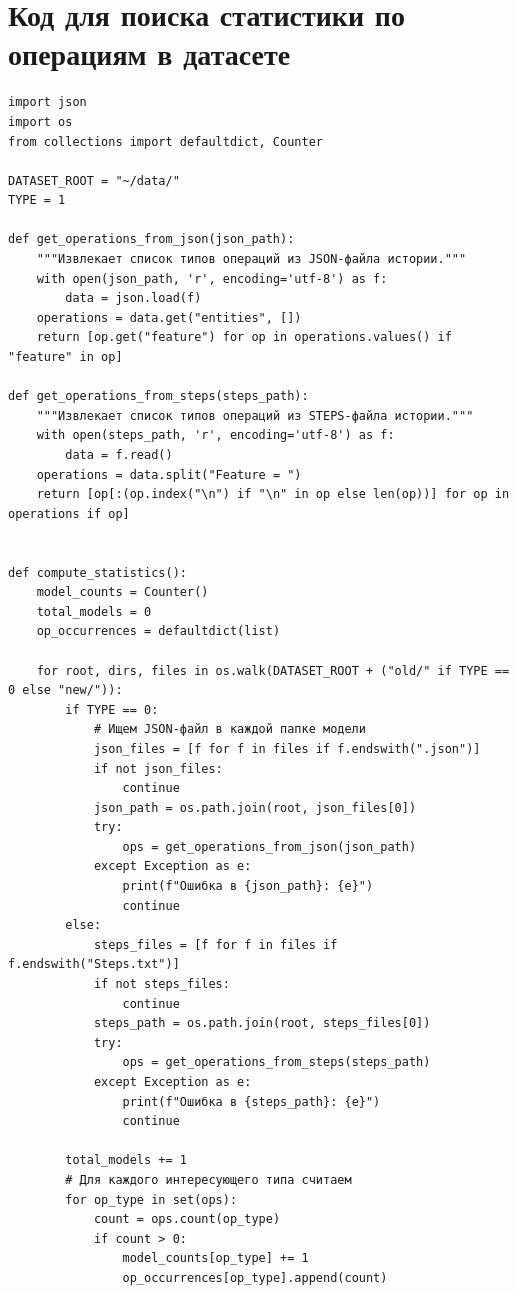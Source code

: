 

\section{Код для поиска статистики по операциям в датасете}

\begin{verbatim}
import json
import os
from collections import defaultdict, Counter

DATASET_ROOT = "~/data/"
TYPE = 1

def get_operations_from_json(json_path):
    """Извлекает список типов операций из JSON-файла истории."""
    with open(json_path, 'r', encoding='utf-8') as f:
        data = json.load(f)
    operations = data.get("entities", [])
    return [op.get("feature") for op in operations.values() if "feature" in op]

def get_operations_from_steps(steps_path):
    """Извлекает список типов операций из STEPS-файла истории."""
    with open(steps_path, 'r', encoding='utf-8') as f:
        data = f.read()
    operations = data.split("Feature = ")
    return [op[:(op.index("\n") if "\n" in op else len(op))] for op in operations if op]


def compute_statistics():
    model_counts = Counter()
    total_models = 0
    op_occurrences = defaultdict(list)
    
    for root, dirs, files in os.walk(DATASET_ROOT + ("old/" if TYPE == 0 else "new/")):
        if TYPE == 0:
            # Ищем JSON-файл в каждой папке модели
            json_files = [f for f in files if f.endswith(".json")]
            if not json_files:
                continue
            json_path = os.path.join(root, json_files[0])
            try:
                ops = get_operations_from_json(json_path)
            except Exception as e:
                print(f"Ошибка в {json_path}: {e}")
                continue
        else:
            steps_files = [f for f in files if f.endswith("Steps.txt")]
            if not steps_files:
                continue
            steps_path = os.path.join(root, steps_files[0])
            try:
                ops = get_operations_from_steps(steps_path)
            except Exception as e:
                print(f"Ошибка в {steps_path}: {e}")
                continue
        
        total_models += 1
        # Для каждого интересующего типа считаем
        for op_type in set(ops):
            count = ops.count(op_type)
            if count > 0:
                model_counts[op_type] += 1
                op_occurrences[op_type].append(count)
    

\end{verbatim}
